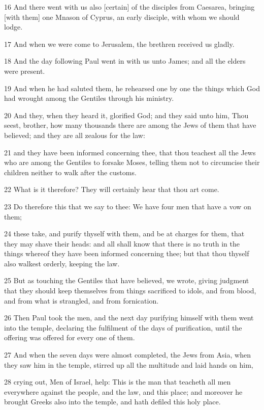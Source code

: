 \par 16 And there went with us also [certain] of the disciples from Caesarea, bringing [with them] one Mnason of Cyprus, an early disciple, with whom we should lodge.
\par 17 And when we were come to Jerusalem, the brethren received us gladly.
\par 18 And the day following Paul went in with us unto James; and all the elders were present.
\par 19 And when he had saluted them, he rehearsed one by one the things which God had wrought among the Gentiles through his ministry.
\par 20 And they, when they heard it, glorified God; and they said unto him, Thou seest, brother, how many thousands there are among the Jews of them that have believed; and they are all zealous for the law:
\par 21 and they have been informed concerning thee, that thou teachest all the Jews who are among the Gentiles to forsake Moses, telling them not to circumcise their children neither to walk after the customs.
\par 22 What is it therefore? They will certainly hear that thou art come.
\par 23 Do therefore this that we say to thee: We have four men that have a vow on them;
\par 24 these take, and purify thyself with them, and be at charges for them, that they may shave their heads: and all shall know that there is no truth in the things whereof they have been informed concerning thee; but that thou thyself also walkest orderly, keeping the law.
\par 25 But as touching the Gentiles that have believed, we wrote, giving judgment that they should keep themselves from things sacrificed to idols, and from blood, and from what is strangled, and from fornication.
\par 26 Then Paul took the men, and the next day purifying himself with them went into the temple, declaring the fulfilment of the days of purification, until the offering was offered for every one of them.
\par 27 And when the seven days were almost completed, the Jews from Asia, when they saw him in the temple, stirred up all the multitude and laid hands on him,
\par 28 crying out, Men of Israel, help: This is the man that teacheth all men everywhere against the people, and the law, and this place; and moreover he brought Greeks also into the temple, and hath defiled this holy place.
